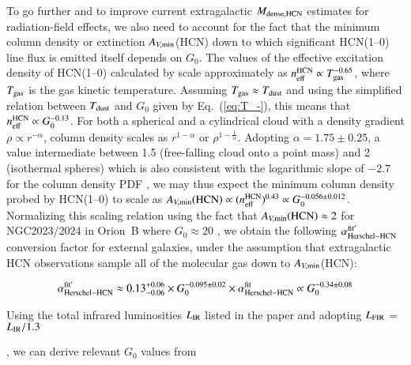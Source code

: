 \documentclass{aa}
\begin{document}
{To go further and to improve current extragalactic $M_{\rm dense,HCN}$ estimates for radiation-field effects,  
we also need to account for the fact that the minimum column density or extinction $A_{V, {\rm min}}$(HCN) down to which significant HCN(1--0) line flux 
is emitted itself depends on $G_0$. 
The values of the effective excitation density of HCN(1--0) calculated by \citet{Shirley15} scale approximately as $n_{\rm eff}^{\rm HCN} \propto T_{\rm gas}^{-0.65}$, 
where $T_{\rm gas}$ is the gas kinetic temperature. 
Assuming $T_{\rm gas} \approx T_{\rm dust} $ and using the simplified relation between $T_{\rm dust} $ and $G_0$ given by Eq.~(\ref{eq:T_-}), 
this means that $n_{\rm eff}^{\rm HCN} \propto G_0^{-0.13}$. 
For both a spherical and a cylindrical cloud with a density gradient $\rho \propto r^{-\alpha} $, column density scales as  $r^{1-\alpha} $ or $\rho^{1-\frac{1}{\alpha}} $. 
Adopting $\alpha = 1.75 \pm 0.25$, a value intermediate between 1.5 (free-falling cloud onto a point mass) and 2 (isothermal spheres) 
which is also consistent with the logarithmic slope of $-2.7$ for the column density PDF \citep[cf.][]{Konyves15}, 
we may thus expect the minimum column density probed by HCN(1--0) to scale as $A_{V, {\rm min}}({\rm HCN}) \propto (n_{\rm eff}^{\rm HCN})^{0.43} \propto G_0^{-0.056 \pm 0.012}$. 
Normalizing this scaling relation using the fact that  $A_{V, {\rm min}}({\rm HCN}) \approx 2$ for NGC2023/2024 in Orion~B  where $G_0 \approx 20$ \citep{Pety16}, 
we obtain the following $\alpha_{\rm Herschel-HCN}^{\rm fit^\prime}$ conversion factor for external galaxies, under the assumption that extragalactic HCN observations 
sample all of the molecular gas down to $A_{V, {\rm min}}$(HCN):

\begin{equation}\label{Eq:alpha2}
\alpha_{\rm Herschel-HCN}^{\rm fit ^\prime} \approx 0.13^{+0.06}_{-0.06} \times G_{\rm 0}^{-0.095\pm 0.02}  \times \alpha_{\rm Herschel-HCN}^{\rm fit}  \propto G_{\rm 0}^{-0.34\pm0.08} 
\end{equation}


Using the total infrared luminosities $L_{\rm IR}$ listed in the \citet{Gao04a} paper  
and adopting $L_{\rm FIR}$ = $L_{\rm IR}/1.3$ \citep{Gracia08}}, 
we can derive 
relevant $G_{0}$ values from 
\end{document}
